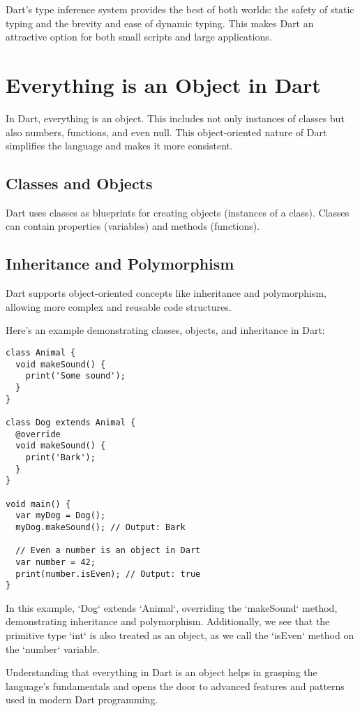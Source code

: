 \documentclass{book}
\begin{document}
Dart's type inference system provides the best of both worlds: the safety of static typing and the brevity and ease of dynamic typing. This makes Dart an attractive option for both small scripts and large applications.

\chapter{Everything is an Object in Dart}

In Dart, everything is an object. This includes not only instances of classes but also numbers, functions, and even null. This object-oriented nature of Dart simplifies the language and makes it more consistent.

\section{Classes and Objects}
Dart uses classes as blueprints for creating objects (instances of a class). Classes can contain properties (variables) and methods (functions).

\section{Inheritance and Polymorphism}
Dart supports object-oriented concepts like inheritance and polymorphism, allowing more complex and reusable code structures.

Here's an example demonstrating classes, objects, and inheritance in Dart:

\begin{lstlisting}[style=dartstyle]
class Animal {
  void makeSound() {
    print('Some sound');
  }
}

class Dog extends Animal {
  @override
  void makeSound() {
    print('Bark');
  }
}

void main() {
  var myDog = Dog();
  myDog.makeSound(); // Output: Bark

  // Even a number is an object in Dart
  var number = 42;
  print(number.isEven); // Output: true
}
\end{lstlisting}

In this example, `Dog` extends `Animal`, overriding the `makeSound` method, demonstrating inheritance and polymorphism. Additionally, we see that the primitive type `int` is also treated as an object, as we call the `isEven` method on the `number` variable.

Understanding that everything in Dart is an object helps in grasping the language's fundamentals and opens the door to advanced features and patterns used in modern Dart programming.
\end{document}
